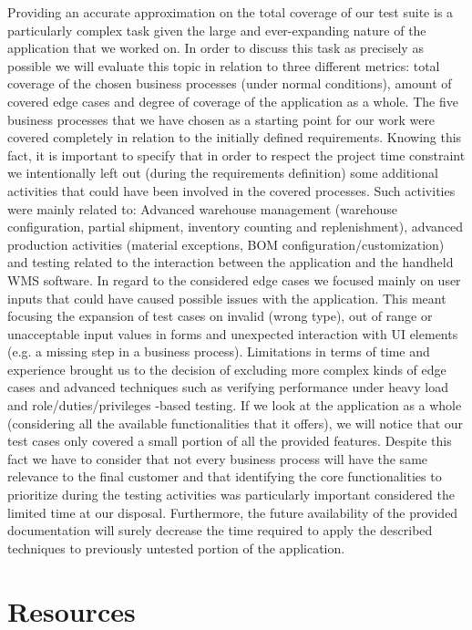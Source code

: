 Providing an accurate approximation on the total coverage of our test suite is a particularly complex task given the large and ever-expanding nature of the application that we worked on. In order to discuss this task as precisely as possible we will evaluate this topic in relation to three different metrics: total coverage of the chosen business processes (under normal conditions), amount of covered edge cases and degree of coverage of the application as a whole. 
The five business processes that we have chosen as a starting point for our work were covered completely in relation to the initially defined requirements. Knowing this fact, it is important to specify that in order to respect the project time constraint we intentionally left out (during the requirements definition) some additional activities that could have been involved in the covered processes. Such activities were mainly related to: Advanced warehouse management (warehouse configuration, partial shipment, inventory counting and replenishment), advanced production activities (material exceptions, BOM configuration/customization) and testing related to the interaction between the application and the handheld WMS software. In regard to the considered edge cases we focused mainly on user inputs that could have caused possible issues with the application. This meant focusing the expansion of test cases on invalid (wrong type), out of range or unacceptable input values in forms and unexpected interaction with UI elements (e.g. a missing step in a business process). Limitations in terms of time and experience brought us to the decision of excluding more complex kinds of edge cases and advanced techniques such as verifying performance under heavy load and role/duties/privileges -based testing.
If we look at the application as a whole (considering all the available functionalities that it offers), we will notice that our test cases only covered a small portion of all the provided features. Despite this fact we have to consider that not every business process will have the same relevance to the final customer and that identifying the core functionalities to prioritize during the testing activities was particularly important considered the limited time at our disposal. Furthermore, the future availability of the provided documentation will surely decrease the time required to apply the described techniques to previously untested portion of the application.

\section{Resources} 

